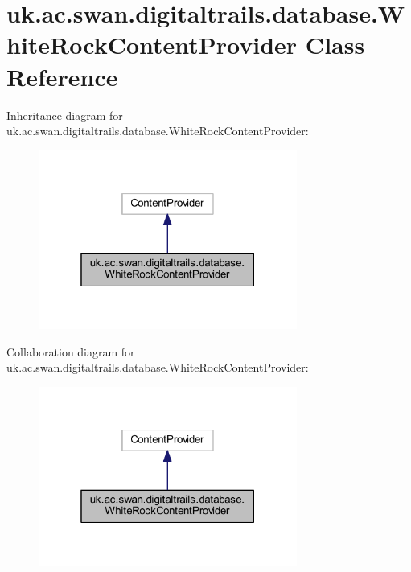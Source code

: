 \hypertarget{classuk_1_1ac_1_1swan_1_1digitaltrails_1_1database_1_1_white_rock_content_provider}{\section{uk.\+ac.\+swan.\+digitaltrails.\+database.\+White\+Rock\+Content\+Provider Class Reference}
\label{classuk_1_1ac_1_1swan_1_1digitaltrails_1_1database_1_1_white_rock_content_provider}
}


Inheritance diagram for uk.\+ac.\+swan.\+digitaltrails.\+database.\+White\+Rock\+Content\+Provider\+:\nopagebreak
\begin{figure}[H]
\begin{center}
\leavevmode
\includegraphics[width=241pt]{classuk_1_1ac_1_1swan_1_1digitaltrails_1_1database_1_1_white_rock_content_provider__inherit__graph}
\end{center}
\end{figure}


Collaboration diagram for uk.\+ac.\+swan.\+digitaltrails.\+database.\+White\+Rock\+Content\+Provider\+:\nopagebreak
\begin{figure}[H]
\begin{center}
\leavevmode
\includegraphics[width=241pt]{classuk_1_1ac_1_1swan_1_1digitaltrails_1_1database_1_1_white_rock_content_provider__coll__graph}
\end{center}
\end{figure}
